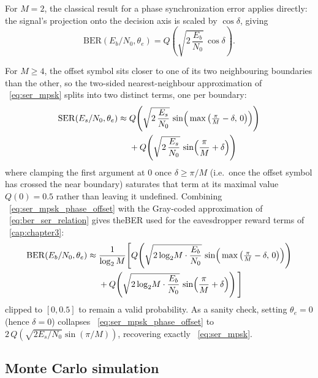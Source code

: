 For $M = 2$, the classical result for a phase synchronization error applies directly: the signal's projection onto the decision axis is scaled by $\cos\delta$, giving
\begin{equation}
    \mathrm{BER}(E_b/N_0, \theta_e) = Q\!\left(\sqrt{2\,\frac{E_b}{N_0}}\,\cos\delta\right).
    \label{eq:ber_bpsk_phase_offset}
\end{equation}

For $M \geq 4$, the offset symbol sits closer to one of its two neighbouring boundaries than the other, so the two-sided nearest-neighbour approximation of \equationname~\eqref{eq:ser_mpsk} splits into two distinct terms, one per boundary:
\begin{align}
    \mathrm{SER}(E_s/N_0, \theta_e) \approx{} & Q\!\left(\sqrt{2\,\frac{E_s}{N_0}}\,\sin\!\Big(\max\big(\tfrac{\pi}{M} - \delta,\, 0\big)\Big)\right) \notag \\
    & {}+ Q\!\left(\sqrt{2\,\frac{E_s}{N_0}}\,\sin\!\left(\frac{\pi}{M} + \delta\right)\right)
    \label{eq:ser_mpsk_phase_offset}
\end{align}
where clamping the first argument at $0$ once $\delta \geq \pi/M$ (i.e.\ once the offset symbol has crossed the near boundary) saturates that term at its maximal value $Q(0) = 0.5$ rather than leaving it undefined. Combining \equationname~\eqref{eq:ser_mpsk_phase_offset} with the Gray-coded approximation of \equationname~\eqref{eq:ber_ser_relation} gives the\gls{BER} used for the eavesdropper reward terms of \chaptername~\ref{cap:chapter3}:
\begin{align}
    \mathrm{BER}(E_b/N_0, \theta_e) \approx{} & \frac{1}{\log_2 M}\Bigg[Q\!\left(\sqrt{2\log_2\!M\cdot\frac{E_b}{N_0}}\,\sin\!\Big(\max\big(\tfrac{\pi}{M}-\delta,\,0\big)\Big)\right) \notag \\
    & {}+ Q\!\left(\sqrt{2\log_2\!M\cdot\frac{E_b}{N_0}}\,\sin\!\left(\frac{\pi}{M}+\delta\right)\right)\Bigg]
    \label{eq:ber_mpsk_phase_offset}
\end{align}
clipped to $[0, 0.5]$ to remain a valid probability. As a sanity check, setting $\theta_e = 0$ (hence $\delta = 0$) collapses \equationname~\eqref{eq:ser_mpsk_phase_offset} to $2\,Q\!\left(\sqrt{2E_s/N_0}\sin(\pi/M)\right)$, recovering exactly \equationname~\eqref{eq:ser_mpsk}.

\subsection{Monte Carlo simulation}

